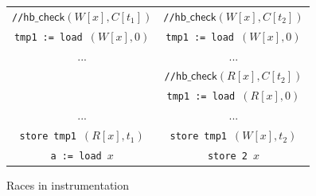 \documentclass[preprint, 10pt]{sigplanconf}
\newcommand{\load}[2]{#1\ \texttt{:= load}\ #2}
\newcommand{\store}[2]{\texttt{store}\ #2\ #1}
\begin{document}
\begin{figure}[htb]
\centering
\begin{tabular}{c || c}
\texttt{//}{$\mathsf{hb\_check}(W[x], C[t_1])$} & \texttt{//}$\mathsf{hb\_check}(W[x], C[t_2])$\\
\load{\texttt{tmp1}}{$(W[x], 0)$} & \load{\texttt{tmp1}}{$(W[x], 0)$}\\
... & ...\\
& \texttt{//}$\mathsf{hb\_check}(R[x], C[t_2])$\\
& \load{\texttt{tmp1}}{$(R[x], 0)$}\\
... & ...\\
\store{$(R[x], t_1)$}{\texttt{tmp1}} & \store{$(W[x], t_2)$}{\texttt{tmp1}}\\
\load{\texttt{a}}{$x$} & \store{$x$}{\texttt{2}}
\end{tabular}

\caption{Races in instrumentation}
\label{instr-race}
\end{figure}
\end{document}
